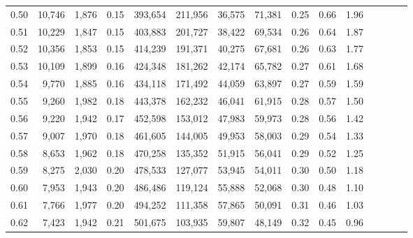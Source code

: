 \begin{tabular}{rrrcrrrrrrrrrrr}
0.50 &  10,746 &  1,876 &                                       0.15 &  393,654 &  211,956 &   36,575 &   71,381 &  0.25 &  0.66 &                         1.96 \\
0.51 &  10,229 &  1,847 &                                       0.15 &  403,883 &  201,727 &   38,422 &   69,534 &  0.26 &  0.64 &                         1.87 \\
0.52 &  10,356 &  1,853 &                                       0.15 &  414,239 &  191,371 &   40,275 &   67,681 &  0.26 &  0.63 &                         1.77 \\
0.53 &  10,109 &  1,899 &                                       0.16 &  424,348 &  181,262 &   42,174 &   65,782 &  0.27 &  0.61 &                         1.68 \\
0.54 &   9,770 &  1,885 &                                       0.16 &  434,118 &  171,492 &   44,059 &   63,897 &  0.27 &  0.59 &                         1.59 \\
0.55 &   9,260 &  1,982 &                                       0.18 &  443,378 &  162,232 &   46,041 &   61,915 &  0.28 &  0.57 &                         1.50 \\
0.56 &   9,220 &  1,942 &                                       0.17 &  452,598 &  153,012 &   47,983 &   59,973 &  0.28 &  0.56 &                         1.42 \\
0.57 &   9,007 &  1,970 &                                       0.18 &  461,605 &  144,005 &   49,953 &   58,003 &  0.29 &  0.54 &                         1.33 \\
0.58 &   8,653 &  1,962 &                                       0.18 &  470,258 &  135,352 &   51,915 &   56,041 &  0.29 &  0.52 &                         1.25 \\
0.59 &   8,275 &  2,030 &                                       0.20 &  478,533 &  127,077 &   53,945 &   54,011 &  0.30 &  0.50 &                         1.18 \\
0.60 &   7,953 &  1,943 &                                       0.20 &  486,486 &  119,124 &   55,888 &   52,068 &  0.30 &  0.48 &                         1.10 \\
0.61 &   7,766 &  1,977 &                                       0.20 &  494,252 &  111,358 &   57,865 &   50,091 &  0.31 &  0.46 &                         1.03 \\
0.62 &   7,423 &  1,942 &                                       0.21 &  501,675 &  103,935 &   59,807 &   48,149 &  0.32 &  0.45 &                         0.96 \\

\end{tabular}
